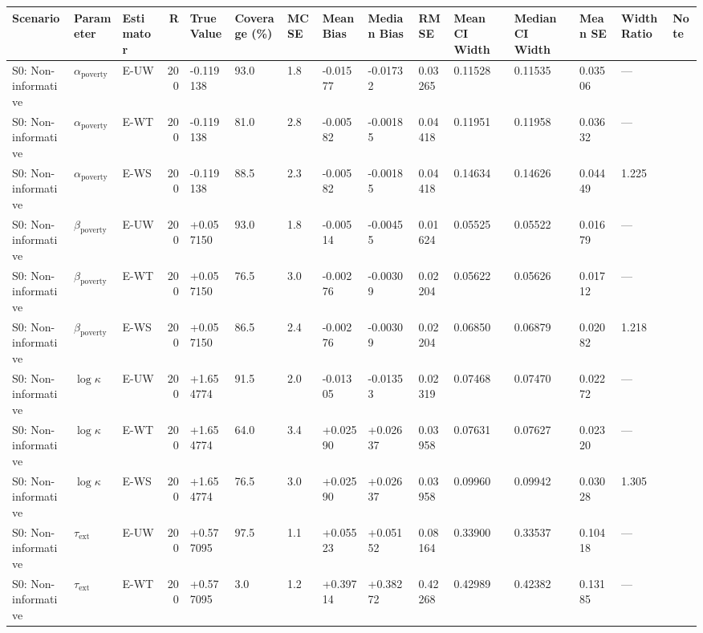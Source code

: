 \begin{table}[htbp]
\centering
\begin{tabular}{lllrlllllllllll}
  \toprule
Scenario & Parameter & Estimator & R & True Value & Coverage (\%) & MCSE & Mean Bias & Median Bias & RMSE & Mean CI Width & Median CI Width & Mean SE & Width Ratio & Note \\ 
  \midrule
S0: Non-informative & $\alpha_{\text{poverty}}$ & E-UW & 200 & -0.119138 & 93.0 & 1.8 & -0.01577 & -0.01732 & 0.03265 & 0.11528 & 0.11535 & 0.03506 & --- &  \\ 
  S0: Non-informative & $\alpha_{\text{poverty}}$ & E-WT & 200 & -0.119138 & 81.0 & 2.8 & -0.00582 & -0.00185 & 0.04418 & 0.11951 & 0.11958 & 0.03632 & --- &  \\ 
  S0: Non-informative & $\alpha_{\text{poverty}}$ & E-WS & 200 & -0.119138 & 88.5 & 2.3 & -0.00582 & -0.00185 & 0.04418 & 0.14634 & 0.14626 & 0.04449 & 1.225 &  \\ 
  S0: Non-informative & $\beta_{\text{poverty}}$ & E-UW & 200 & +0.057150 & 93.0 & 1.8 & -0.00514 & -0.00455 & 0.01624 & 0.05525 & 0.05522 & 0.01679 & --- &  \\ 
  S0: Non-informative & $\beta_{\text{poverty}}$ & E-WT & 200 & +0.057150 & 76.5 & 3.0 & -0.00276 & -0.00309 & 0.02204 & 0.05622 & 0.05626 & 0.01712 & --- &  \\ 
  S0: Non-informative & $\beta_{\text{poverty}}$ & E-WS & 200 & +0.057150 & 86.5 & 2.4 & -0.00276 & -0.00309 & 0.02204 & 0.06850 & 0.06879 & 0.02082 & 1.218 &  \\ 
  S0: Non-informative & $\log\kappa$ & E-UW & 200 & +1.654774 & 91.5 & 2.0 & -0.01305 & -0.01353 & 0.02319 & 0.07468 & 0.07470 & 0.02272 & --- &  \\ 
  S0: Non-informative & $\log\kappa$ & E-WT & 200 & +1.654774 & 64.0 & 3.4 & +0.02590 & +0.02637 & 0.03958 & 0.07631 & 0.07627 & 0.02320 & --- &  \\ 
  S0: Non-informative & $\log\kappa$ & E-WS & 200 & +1.654774 & 76.5 & 3.0 & +0.02590 & +0.02637 & 0.03958 & 0.09960 & 0.09942 & 0.03028 & 1.305 &  \\ 
  S0: Non-informative & $\tau_{\text{ext}}$ & E-UW & 200 & +0.577095 & 97.5 & 1.1 & +0.05523 & +0.05152 & 0.08164 & 0.33900 & 0.33537 & 0.10418 & --- &  \\ 
  S0: Non-informative & $\tau_{\text{ext}}$ & E-WT & 200 & +0.577095 & 3.0 & 1.2 & +0.39714 & +0.38272 & 0.42268 & 0.42989 & 0.42382 & 0.13185 & --- &  \\ 

\end{tabular}
\end{table}

